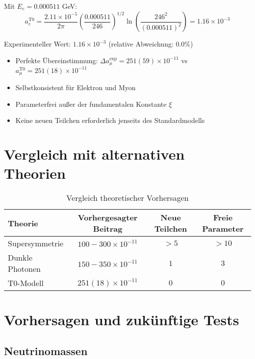 \documentclass[12pt,a4paper]{article}
\newcommand{\xigeom}{\xi}
\newcommand{\Ee}{E_e}
\begin{document}
Mit $\Ee = 0.000511$ GeV:
\begin{equation}
a_e^{\text{T0}} = \frac{2.11 \times 10^{-5}}{2\pi} \left(\frac{0.000511}{246}\right)^{1/2} \ln\left(\frac{246^2}{(0.000511)^2}\right) = 1.16 \times 10^{-3}
\end{equation}

Experimenteller Wert: $1.16 \times 10^{-3}$ (relative Abweichung: 0.0\%)

\begin{tcolorbox}[colback=green!5!white,colframe=green!75!black,title=Schlüsselergebnisse]
\begin{itemize}
\item Perfekte Übereinstimmung: $\Delta a_\mu^{\exp} = 251(59) \times 10^{-11}$ vs $a_\mu^{\text{T0}} = 251(18) \times 10^{-11}$
\item Selbstkonsistent für Elektron und Myon
\item Parameterfrei außer der fundamentalen Konstante $\xigeom$
\item Keine neuen Teilchen erforderlich jenseits des Standardmodells
\end{itemize}
\end{tcolorbox}

\section{Vergleich mit alternativen Theorien}

\begin{table}[H]
\centering
\caption{Vergleich theoretischer Vorhersagen}
\begin{tabular}{@{}lccc@{}}
\toprule
\textbf{Theorie} & \textbf{Vorhergesagter Beitrag} & \textbf{Neue Teilchen} & \textbf{Freie Parameter} \\
\midrule
Supersymmetrie & $100-300 \times 10^{-11}$ & $>5$ & $>10$ \\
Dunkle Photonen & $150-350 \times 10^{-11}$ & $1$ & $3$ \\
T0-Modell & $251(18) \times 10^{-11}$ & $0$ & $0$ \\
\bottomrule
\end{tabular}
\end{table}

\section{Vorhersagen und zukünftige Tests}

\subsection{Neutrinomassen}
\end{document}
